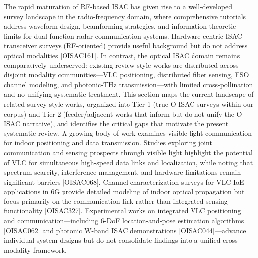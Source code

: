 {}
\markdownRendererSectionEnd \markdownRendererSectionBegin
{}\markdownRendererInterblockSeparator
{}The rapid maturation of RF-based ISAC has given rise to a well-developed survey landscape in the radio-frequency domain, where comprehensive tutorials address waveform design, beamforming strategies, and information-theoretic limits for dual-function radar-communication systems. Hardware-centric ISAC transceiver surveys (RF-oriented) provide useful background but do not address optical modalities [O\markdownRendererUnderscore{}ISAC\markdownRendererUnderscore{}161]. In contrast, the optical ISAC domain remains comparatively underserved: existing review-style works are distributed across disjoint modality communities—VLC positioning, distributed fiber sensing, FSO channel modeling, and photonic-THz transmission—with limited cross-pollination and no unifying systematic treatment. This section maps the current landscape of related survey-style works, organized into Tier-1 (true O-ISAC surveys within our corpus) and Tier-2 (feeder/adjacent works that inform but do not unify the O-ISAC narrative), and identifies the critical gaps that motivate the present systematic review.\markdownRendererParagraphSeparator
{} A growing body of work examines visible light communication for indoor positioning and data transmission. Studies exploring joint communication and sensing prospects through visible light highlight the potential of VLC for simultaneous high-speed data links and localization, while noting that spectrum scarcity, interference management, and hardware limitations remain significant barriers [O\markdownRendererUnderscore{}ISAC\markdownRendererUnderscore{}068]. Channel characterization surveys for VLC-IoE applications in 6G provide detailed modeling of indoor optical propagation but focus primarily on the communication link rather than integrated sensing functionality [O\markdownRendererUnderscore{}ISAC\markdownRendererUnderscore{}327]. Experimental works on integrated VLC positioning and communication—including 6-DoF location-and-pose estimation algorithms [O\markdownRendererUnderscore{}ISAC\markdownRendererUnderscore{}062] and photonic W-band ISAC demonstrations [O\markdownRendererUnderscore{}ISAC\markdownRendererUnderscore{}044]—advance individual system designs but do not consolidate findings into a unified cross-modality framework.\markdownRendererParagraphSeparator
